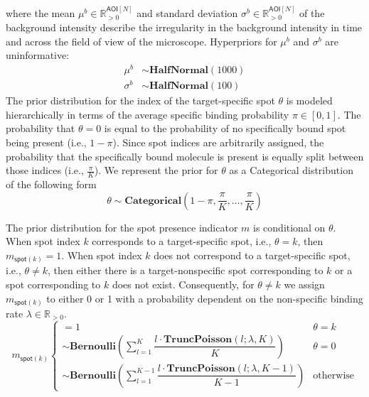 \noindent
where the mean $\mu^b \in \mathbb{R}_{>0}^{\mathsf{AOI}[N]}$ and standard deviation $\sigma^b \in \mathbb{R}_{>0}^{\mathsf{AOI}[N]}$ of the background intensity describe the irregularity in the background intensity in time and across the field of view of the microscope. Hyperpriors for $\mu^b$ and $\sigma^b$ are uninformative:
%
\begin{subequations}
\begin{align}
    \mu^b &\sim \mathbf{HalfNormal}(1000) \\
    \sigma^b &\sim \mathbf{HalfNormal}(100)
\end{align}
\end{subequations}
%
The prior distribution for the index of the target-specific spot $\theta$ is modeled hierarchically in terms of the average specific binding probability $\pi \in [0, 1] $. The probability that $\theta = 0$ is equal to the probability of no specifically bound spot being present (i.e., $1-\pi$). Since spot indices are arbitrarily assigned, the probability that the specifically bound molecule is present is equally split between those indices (i.e., $\frac{\pi}{K}$). We represent the prior for $\theta$ as a Categorical distribution of the following form
%
\begin{equation}
    \theta \sim \mathbf{Categorical}\left(1 - \pi, \frac{\pi}{K}, \dots, \frac{\pi}{K}\right)
\end{equation}

The prior distribution for the spot presence indicator $m$ is conditional on $\theta$. When spot index $k$ corresponds to a target-specific spot, i.e., $\theta = k$, then $m_{\mathsf{spot}(k)} = 1$. When spot index $k$ does not correspond to a target-specific spot, i.e., $\theta \neq k$, then either there is a target-nonspecific spot corresponding to $k$ or a spot corresponding to $k$ does not exist. Consequently, for $\theta \neq k$ we assign $m_{\mathsf{spot}(k)}$ to either 0 or 1 with a probability dependent on the non-specific binding rate $\lambda \in \mathbb{R}_{>0}$.
%
\begin{equation}
    m_{\mathsf{spot}(k)}
    \begin{cases}
         = 1 & \text{$\theta = k$} \\
        \sim \mathbf{Bernoulli} \left( \sum_{l=1}^K \dfrac{l \cdot \mathbf{TruncPoisson}(l; \lambda, K)}{K} \right) & \text{$\theta = 0$} \\
        \sim \mathbf{Bernoulli} \left( \sum_{l=1}^{K-1} \dfrac{l \cdot \mathbf{TruncPoisson}(l; \lambda, K-1)}{K-1} \right) & \text{otherwise}
    \end{cases}
\end{equation}

